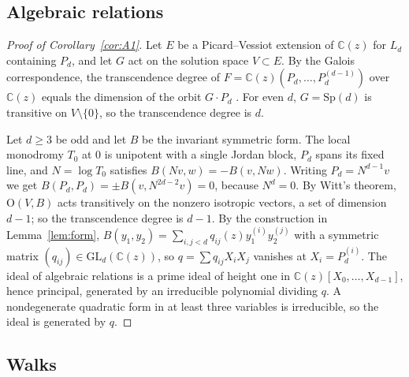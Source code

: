 \documentclass[11pt]{amsart}
\theoremstyle{definition}
\newcommand{\C}{\mathbb C}
\newcommand{\GL}{\mathrm{GL}}
\newcommand{\Sp}{\mathrm{Sp}}
\newcommand{\Ort}{\mathrm{O}}
\begin{document}
\subsection{Algebraic relations}

\begin{proof}[Proof of Corollary~\ref{cor:A1}]
Let $E$ be a Picard--Vessiot extension of $\C(z)$ for $L_d$ containing $P_d$, and let $G$ act on the solution space $V\subset E$. By the Galois correspondence, the transcendence degree of $F=\C(z)(P_d,\dots,P_d^{(d-1)})$ over $\C(z)$ equals the dimension of the orbit $G\cdot P_d$ \cite[Ch.~1]{vdPS03}. For even $d$, $G=\Sp(d)$ is transitive on $V\setminus\{0\}$, so the transcendence degree is $d$.

Let $d\ge3$ be odd and let $B$ be the invariant symmetric form. The local monodromy $T_0$ at $0$ is unipotent with a single Jordan block, $P_d$ spans its fixed line, and $N=\log T_0$ satisfies $B(Nv,w)=-B(v,Nw)$. Writing $P_d=N^{d-1}v$ we get $B(P_d,P_d)=\pm B(v,N^{2d-2}v)=0$, because $N^d=0$. By Witt's theorem, $\Ort(V,B)$ acts transitively on the nonzero isotropic vectors, a set of dimension $d-1$; so the transcendence degree is $d-1$. By the construction in Lemma~\ref{lem:form}, $B(y_1,y_2)=\sum_{i,j<d}q_{ij}(z)y_1^{(i)}y_2^{(j)}$ with a symmetric matrix $(q_{ij})\in\GL_d(\C(z))$, so $q=\sum q_{ij}X_iX_j$ vanishes at $X_i=P_d^{(i)}$. The ideal of algebraic relations is a prime ideal of height one in $\C(z)[X_0,\dots,X_{d-1}]$, hence principal, generated by an irreducible polynomial dividing $q$. A nondegenerate quadratic form in at least three variables is irreducible, so the ideal is generated by $q$.
\end{proof}

\subsection{Walks}
\end{document}
